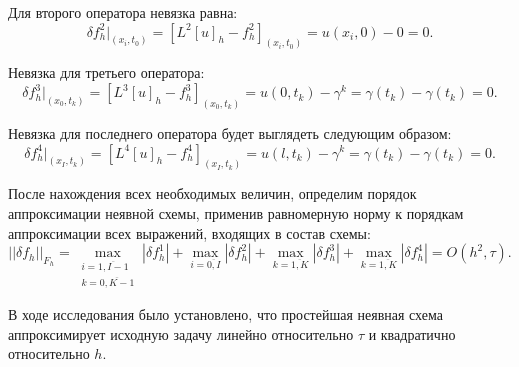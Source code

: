 {{		Для второго оператора невязка равна:
		\begin{equation}
			\delta f^2_h|_{ (x_i, t_0 ) } = [L^2[u]_h - f^2_h]_{ (x_i, t_0 ) } = u(x_i , 0) - 0 = 0\nonumber.
		\end{equation}
		
		Невязка для третьего оператора:
		\begin{equation}
			\delta f^3_h|_{ (x_0, t_k ) } = [L^3[u]_h - f^3_h]_{ (x_0, t_k ) } = u(0 , t_k) - \gamma^k = \gamma(t_k) - \gamma(t_k) = 0\nonumber.
		\end{equation}
		
		Невязка для последнего оператора будет выглядеть следующим образом:
		\begin{equation}
			\delta f^4_h|_{ (x_I, t_k ) } = [L^4[u]_h - f^4_h]_{ (x_I, t_k ) } = u(l , t_k) - \gamma^k = \gamma(t_k) - \gamma(t_k) = 0\nonumber.
		\end{equation}
		
		После нахождения всех необходимых величин, определим порядок аппроксимации неявной схемы, применив равномерную норму к порядкам аппроксимации всех выражений, входящих в состав схемы:
		\begin{equation}
			|| \delta f_h ||_{F_h} = \max_{\substack{i = \overline{1, I-1} \\ k = \overline{0, K-1}}} | \delta f^1_h| + \max_{i = \overline{0, I}} | \delta f^2_h| + \max_{k = \overline{1, K}} | \delta f^3_h| +  \max_{k = \overline{1, K}} | \delta f^4_h| = O(h^2, \tau).
		\end{equation}
		
		В ходе исследования было установлено, что простейшая неявная схема аппроксимирует исходную задачу линейно относительно $\tau$ и квадратично относительно $h$. 
		
}}
